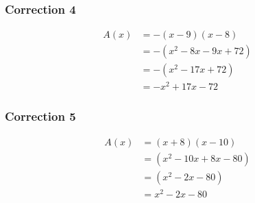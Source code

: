 \documentclass[15pt, mathserif]{beamer}
\begin{document}
\begin{frame}
\vspace{-10mm}
	\frametitle{Correction 4}
	\begin{align*} A(x) &= -\left(x-9\right)\left(x-8\right)\\
		&=-\left(x^2-8x-9x+72\right)\\
		&=-\left(x^2-17x+72\right)\\
		&=-x^2+17x-72
	\end{align*}
\end{frame}


\begin{frame}
\vspace{-10mm}
	\frametitle{Correction 5}
	\begin{align*} A(x) &= \left(x+8\right)\left(x-10\right)\\
		&=\left(x^2-10x+8x-80\right)\\
		&=\left(x^2-2x-80\right)\\
		&=x^2-2x-80
	\end{align*}
\end{frame}
\end{document}
